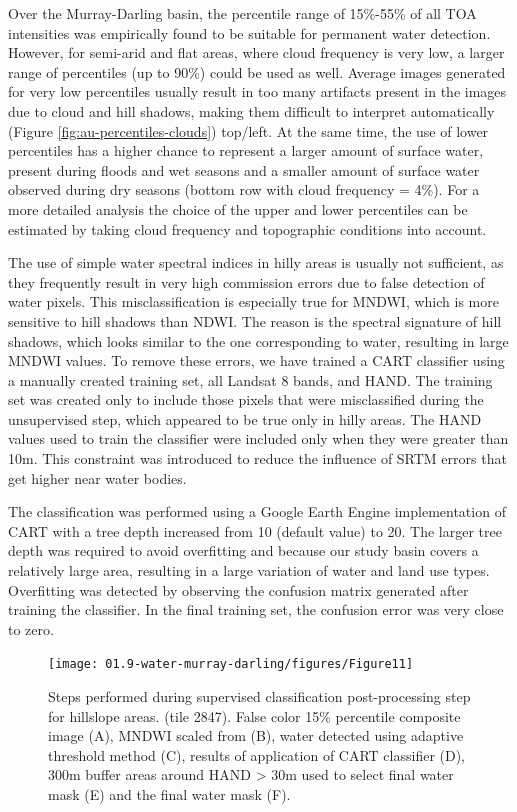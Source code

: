 Over the Murray-Darling basin, the percentile range of 15\%-55\% of all TOA intensities was empirically found to be suitable for permanent water detection. However, for semi-arid and flat areas, where cloud frequency is very low, a larger range of percentiles (up to 90\%) could be used as well. Average images generated for very low percentiles usually result in too many artifacts present in the images due to cloud and hill shadows, making them difficult to interpret automatically (Figure \ref{fig:au-percentiles-clouds}) top/left. At the same time, the use of lower percentiles has a higher chance to represent a larger amount of surface water, present during floods and wet seasons and a smaller amount of surface water observed during dry seasons (bottom row with cloud frequency = 4\%). For a more detailed analysis the choice of the upper and lower percentiles can be estimated by taking cloud frequency and topographic conditions into account.

The use of simple water spectral indices in hilly areas is usually not sufficient, as they frequently result in very high commission errors due to false detection of water pixels. This misclassification is especially true for MNDWI, which is more sensitive to hill shadows than NDWI. The reason is the spectral signature of hill shadows, which looks similar to the one corresponding to water, resulting in large MNDWI values. To remove these errors, we have trained a CART classifier using a manually created training set, all Landsat 8 bands, and HAND. The training set was created only to include those pixels that were misclassified during the unsupervised step, which appeared to be true only in hilly areas. The HAND values used to train the classifier were included only when they were greater than 10m. This constraint was introduced to reduce the influence of SRTM errors that get higher near water bodies.

The classification was performed using a Google Earth Engine implementation of CART with a tree depth increased from 10 (default value) to 20. The larger tree depth was required to avoid overfitting and because our study basin covers a relatively large area, resulting in a large variation of water and land use types. Overfitting was detected by observing the confusion matrix generated after training the classifier. In the final training set, the confusion error was very close to zero. 

\begin{figure}[H]
	\centering
	\texttt{[image: 01.9-water-murray-darling/figures/Figure11]}
	\caption{Steps performed during supervised classification post-processing step for hillslope areas. (tile 2847). False color 15\% percentile composite image (A), MNDWI scaled from (B), water detected using adaptive threshold method (C), results of application of CART classifier (D), 300m buffer areas around HAND > 30m used to select final water mask (E) and the final water mask (F).}
\end{figure}

